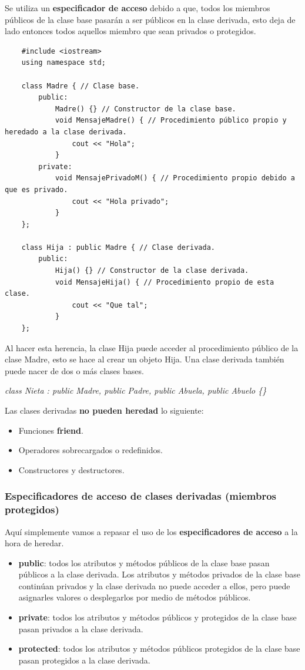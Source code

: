 Se utiliza un \textbf{especificador de acceso} debido a que, todos los miembros públicos de la clase base pasarán a ser públicos en la clase derivada, esto deja de lado entonces todos aquellos miembro que sean privados o protegidos.
\begin{lstlisting}
    #include <iostream>
    using namespace std;
    
    class Madre { // Clase base.
        public:
            Madre() {} // Constructor de la clase base.
            void MensajeMadre() { // Procedimiento público propio y heredado a la clase derivada.
                cout << "Hola";
            }
        private:
            void MensajePrivadoM() { // Procedimiento propio debido a que es privado.
                cout << "Hola privado";
            }
    };
    
    class Hija : public Madre { // Clase derivada.
        public:
            Hija() {} // Constructor de la clase derivada.
            void MensajeHija() { // Procedimiento propio de esta clase.
                cout << "Que tal";
            }
    };
\end{lstlisting}

Al hacer esta herencia, la clase Hija puede acceder al procedimiento público de la clase Madre, esto se hace al crear un objeto Hija. Una clase derivada también puede nacer de dos o más clases bases.
\begin{center}
	\textit{class Nieta : public Madre, public Padre, public Abuela, public Abuelo \{\}}
\end{center}

Las clases derivadas \textbf{no pueden heredad} lo siguiente:
\begin{itemize}
    \item Funciones \textbf{friend}.
    \item Operadores sobrecargados o redefinidos.
    \item Constructores y destructores.
\end{itemize}


\subsubsection{Especificadores de acceso de clases derivadas (miembros protegidos)}
\hspace{0.55cm}Aquí simplemente vamos a repasar el uso de los \textbf{especificadores de acceso} a la hora de heredar.
\begin{itemize}
    \item \textbf{public}: todos los atributos y métodos públicos de la clase base pasan públicos a la clase derivada. Los atributos y métodos privados de la clase base continúan privados y la clase derivada no puede acceder a ellos, pero puede asignarles valores o desplegarlos por medio de métodos públicos.
    \item \textbf{private}: todos los atributos y métodos públicos y protegidos de la clase base pasan privados a la clase derivada.
    \item \textbf{protected}: todos los atributos y métodos públicos protegidos de la clase base pasan protegidos a la clase derivada.
\end{itemize}

